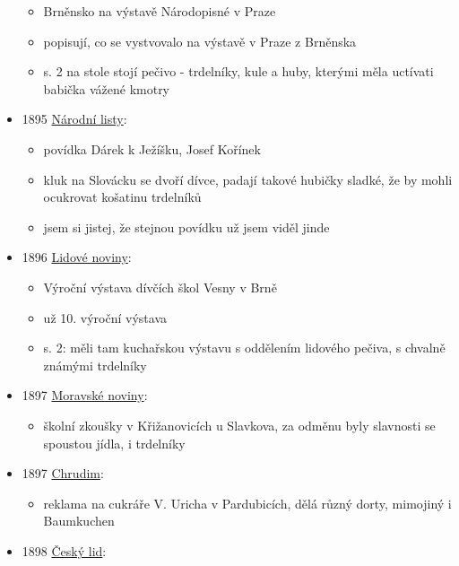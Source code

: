 \begin{itemize}
  \begin{itemize}
  \tightlist
  \item
    Brněnsko na výstavě Národopisné v Praze
  \item
    popisují, co se vystvovalo na výstavě v Praze z Brněnska
  \item
    s. 2 na stole stojí pečivo - trdelníky, kule a huby, kterými měla
    uctívati babička vážené kmotry
  \end{itemize}
\item
  1895
  \href{https://ceskadigitalniknihovna.cz/uuid/uuid:f392b3ef-435d-11dd-b505-00145e5790ea}{Národní
  listy}:

  \begin{itemize}
  \tightlist
  \item
    povídka Dárek k Ježíšku, Josef Kořínek
  \item
    kluk na Slovácku se dvoří dívce, padají takové hubičky sladké, že by
    mohli ocukrovat košatinu trdelníků
  \item
    jsem si jistej, že stejnou povídku už jsem viděl jinde
  \end{itemize}
\item
  1896
  \href{https://ceskadigitalniknihovna.cz/uuid/uuid:b805f3a6-435d-11dd-b505-00145e5790ea}{Lidové
  noviny}:

  \begin{itemize}
  \tightlist
  \item
    Výroční výstava dívčích škol Vesny v Brně
  \item
    už 10. výroční výstava
  \item
    s. 2: měli tam kuchařskou výstavu s oddělením lidového pečiva, s
    chvalně známými trdelníky
  \end{itemize}
\item
  1897
  \href{https://www.digitalniknihovna.cz/vkol/uuid/uuid:1a1f3964-02ac-463e-8a5b-8d7577a0ad33}{Moravské
  noviny}:

  \begin{itemize}
  \tightlist
  \item
    školní zkoušky v Křižanovicích u Slavkova, za odměnu byly slavnosti
    se spoustou jídla, i trdelníky
  \end{itemize}
\item
  1897
  \href{https://ceskadigitalniknihovna.cz/uuid/uuid:c3a426e0-2b81-11e7-a77b-001018b5eb5c}{Chrudim}:

  \begin{itemize}
  \tightlist
  \item
    reklama na cukráře V. Uricha v Pardubicích, dělá různý dorty,
    mimojiný i Baumkuchen
  \end{itemize}
\item
  1898
  \href{https://ceskadigitalniknihovna.cz/view/uuid:38bef4ba-03a2-433c-a4ed-a9914d68b1a5?page=uuid\%3A5c5ae01f-9a43-4111-b72b-1cfe6710f70a&fulltext=trdeln\%C3\%ADk\%20OR\%20trdeln\%C3\%ADky\%20OR\%20trdeln\%C3\%ADk\%C5\%AF&source=knav}{Český
  lid}:


\end{itemize}
